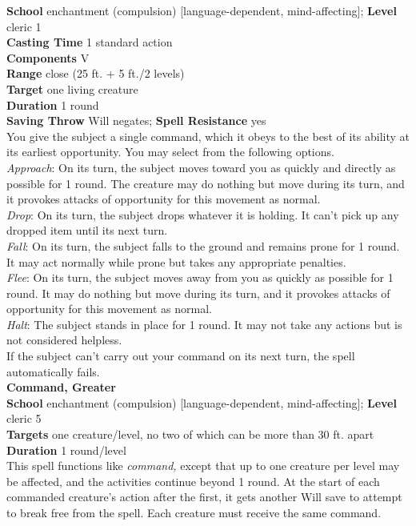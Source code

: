 \textbf{School} enchantment (compulsion) [language-dependent, mind-affecting]; \textbf{Level} cleric 1\\
\textbf{Casting Time} 1 standard action\\
\textbf{Components} V\\
\textbf{Range} close (25 ft. + 5 ft./2 levels)\\
\textbf{Target} one living creature\\
\textbf{Duration} 1 round\\
\textbf{Saving Throw }Will negates; \textbf{Spell Resistance} yes\\
You give the subject a single command, which it obeys to the best of its ability at its earliest opportunity. You may select from the following options.\\
\textit{Approach}: On its turn, the subject moves toward you as quickly and directly as possible for 1 round. The creature may do nothing but move during its turn, and it provokes attacks of opportunity for this movement as normal.\\
\textit{Drop}: On its turn, the subject drops whatever it is holding. It can't pick up any dropped item until its next turn.\\
\textit{Fall}: On its turn, the subject falls to the ground and remains prone for 1 round. It may act normally while prone but takes any appropriate penalties.\\
\textit{Flee}: On its turn, the subject moves away from you as quickly as possible for 1 round. It may do nothing but move during its turn, and it provokes attacks of opportunity for this movement as normal.\\
\textit{Halt}: The subject stands in place for 1 round. It may not take any actions but is not considered helpless.\\
If the subject can't carry out your command on its next turn, the spell automatically fails.\\
\textbf{Command, Greater}\\
\textbf{School} enchantment (compulsion) [language-dependent, mind-affecting]; \textbf{Level} cleric 5 \\
\textbf{Targets} one creature/level, no two of which can be more than 30 ft. apart\\
\textbf{Duration} 1 round/level\\
This spell functions like \textit{command, }except that up to one creature per level may be affected, and the activities continue beyond 1 round. At the start of each commanded creature's action after the first, it gets another Will save to attempt to break free from the spell. Each creature must receive the same command.\\
